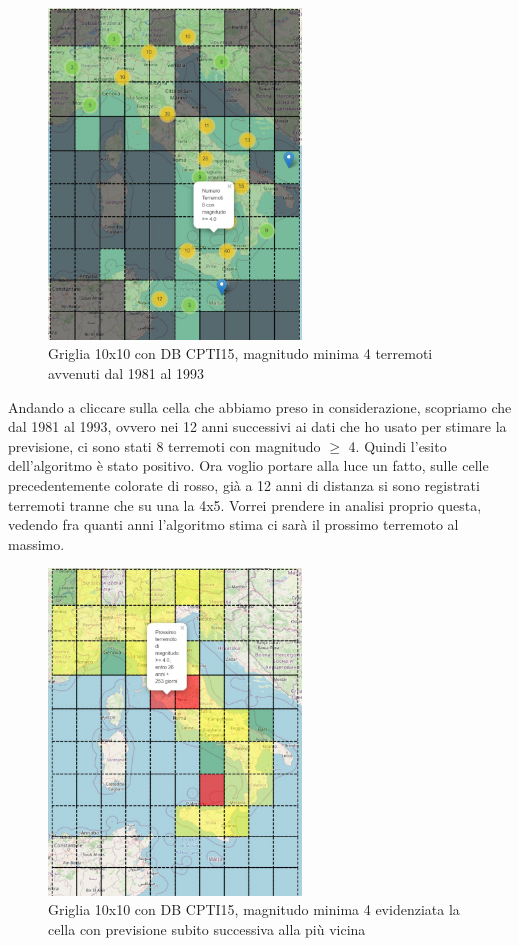 \begin{figure}[H]
   \centering
   \includegraphics[width=0.600\textwidth]{images/10x10_mag4_12anniDopo_CPTI15.jpg}
   \caption{Griglia 10x10 con DB CPTI15, magnitudo minima 4 terremoti avvenuti dal 1981 al 1993}
   \label{fig:10x10_mag4_12anniDopo}
\end{figure}

Andando a cliccare sulla cella che abbiamo preso in considerazione, scopriamo che dal 1981 al 1993, ovvero nei 12 anni successivi ai dati che ho usato per stimare la previsione, ci sono stati 8 terremoti con magnitudo $\ge$ 4. Quindi l'esito dell'algoritmo \`e stato positivo. Ora voglio portare alla luce un fatto, sulle celle precedentemente colorate di rosso, gi\`a a 12 anni di distanza si sono registrati terremoti tranne che su una la 4x5. Vorrei prendere in analisi proprio questa, vedendo fra quanti anni l'algoritmo stima ci sar\`a il prossimo terremoto al massimo.

\begin{figure}[H]
   \centering
   \includegraphics[width=0.600\textwidth]{images/10x10_mag4_26anniEvidenziato_CPTI15.jpg}
   \caption{Griglia 10x10 con DB CPTI15, magnitudo minima 4 evidenziata la cella con previsione subito successiva alla pi\`u vicina}
   \label{fig:10x10_mag4_26anniEvidenziato}
\end{figure}

